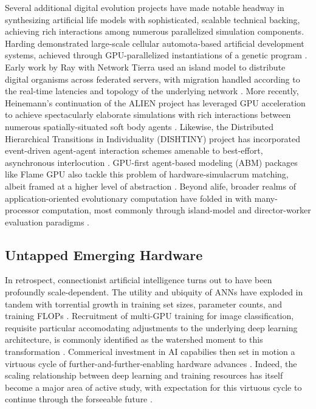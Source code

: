 Several additional digital evolution projects have made notable headway in synthesizing artificial life models with sophisticated, scalable technical backing, achieving rich interactions among numerous parallelized simulation components.
Harding demonstrated large-scale cellular automota-based artificial development systems, achieved through GPU-parallelized instantiations of a genetic program  \citep{harding2007fast_ieee}.
Early work by Ray with Network Tierra used an island model to distribute digital organisms across federated servers, with migration handled according to the real-time latencies and topology of the underlying network \citep{ray1995proposal}.
More recently, Heinemann's continuation of the ALIEN project has leveraged GPU acceleration to achieve spectacularly elaborate simulations with rich interactions between numerous spatially-situated soft body agents \citep{heinemann2008artificial}.
Likewise, the Distributed Hierarchical Transitions in Individuality (DISHTINY) project has incorporated event-driven agent-agent interaction schemes amenable to best-effort, asynchronous interlocution \citep{moreno2022exploring,moreno2021conduit}.
GPU-first agent-based modeling (ABM) packages like Flame GPU also tackle this problem of hardware-simulacrum matching, albeit framed at a higher level of abstraction \citep{richmond2010high}.
Beyond alife, broader realms of application-oriented evolutionary computation have folded in with many-processor computation, most commonly through island-model and director-worker evaluation paradigms \citep{abdelhafez2019performance,cantu2001master}.

\subsection{Untapped Emerging Hardware}

In retrospect, connectionist artificial intelligence turns out to have been profoundly scale-dependent.
The utility and ubiquity of ANNs have exploded in tandem with torrential growth in training set sizes, parameter counts, and training FLOPs \citep{marcus2018deep}.
Recruitment of multi-GPU training for image classification, requisite particular accomodating adjustments to the underlying deep learning architecture, is commonly identified as the watershed moment to this transformation
 \citep{krizhevsky2012imagenet}.
Commerical investment in AI capabilies then set in motion a virtuous cycle of further-and-further-enabling hardware advances \citep{jouppi2017datacenter}.
Indeed, the scaling relationship between deep learning and training resources has itself become a major area of active study, with expectation for this virtuous cycle to continue through the forseeable future \citep{kaplan2020scaling}.

